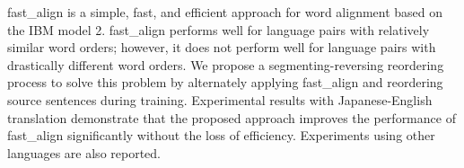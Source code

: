 fast\_align is a simple, fast, and efficient approach for word alignment based on the IBM model 2. fast\_align performs well for language pairs with relatively similar word orders; however, it does not perform well for language pairs with drastically different word orders. We propose a segmenting-reversing reordering process to solve this problem by alternately applying fast\_align and reordering source sentences during training. Experimental results with Japanese-English translation demonstrate that the proposed approach improves the performance of fast\_align significantly without the loss of efficiency. Experiments using other languages are also reported.
